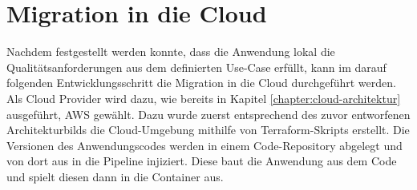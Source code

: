 

\section{Migration in die Cloud}
Nachdem festgestellt werden konnte, dass die Anwendung lokal die Qualitätsanforderungen aus dem definierten Use-Case erfüllt, kann im darauf folgenden Entwicklungsschritt die Migration in die Cloud durchgeführt werden. Als Cloud Provider wird dazu, wie bereits in Kapitel \ref{chapter:cloud-architektur} ausgeführt, \ac{AWS} gewählt. Dazu wurde zuerst entsprechend des zuvor entworfenen Architekturbilds die Cloud-Umgebung mithilfe von \gls{Terraform}-Skripts erstellt. Die Versionen des Anwendungscodes werden in einem Code-Repository abgelegt und von dort aus in die Pipeline injiziert. Diese baut die Anwendung aus dem Code und spielt diesen dann in die Container aus. \pagebreak